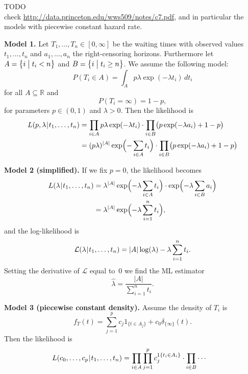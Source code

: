 \documentclass[a4paper]{article}
\def\cond#1#2{(#1\mskip1mu|\mskip1mu #2)}
\def\L{\mathcal{L}}
\def\R{\mathbb{R}}
\begin{document}
TODO\\
check \url{http://data.princeton.edu/wws509/notes/c7.pdf}, and in 
particular the models with piecewise constant hazard rate.

\bigskip

\textbf{Model 1.}
Let $T_1, \ldots, T_n \in [0, \infty]$ be the waiting times with observed
values $t_1, \ldots, t_n$ and $a_1,
\ldots, a_n$ the right-censoring horizons.  Furthermore let $A = \bigl\{ i \bigm|
t_i < n \bigr\}$ and $B = \bigl\{ i \bigm| t_i \geq n \bigr\}$.  We assume
the following model:
\begin{equation*}
  P(T_i \in A)
  = \int_A p \lambda \exp(-\lambda t_i) \,dt_i
\end{equation*}
for all $A\subseteq\R$ and
\begin{equation*}
  P(T_i = \infty)
  = 1-p,
\end{equation*}
for parameters $p\in(0,1)$ and $\lambda>0$.
Then the likelihood is
\begin{align*}
  L\cond{p, \lambda}{t_1, \ldots, t_n}
  &= \prod_{i\in A} p \lambda \exp(-\lambda t_i)
     \cdot \prod_{i\in B} \bigl(p \exp(-\lambda a_i) + 1-p \bigr) \\
   &= (p\lambda)^{|A|} \exp\Bigl( -\sum_{i\in A}t_i \Bigr)
     \cdot \prod_{i\in B} \bigl(p \exp(-\lambda a_i) + 1-p \bigr)
\end{align*}

\textbf{Model 2 (simplified).}
If we fix $p=0$, the likelihood becomes
\begin{align*}
  L\cond{\lambda}{t_1, \ldots, t_n}
   &= \lambda^{|A|} \exp\Bigl( - \lambda \sum_{i\in A}t_i \Bigr)
     \cdot \exp\Bigl( - \lambda \sum_{i\in B}a_i \Bigr) \\
   &= \lambda^{|A|} \exp\Bigl( - \lambda \sum_{i=1}^n t_i \Bigr),
\end{align*}
and the log-likelihood is
\begin{equation*}
  \L\cond{\lambda}{t_1, \ldots, t_n}
    = |A| \log(\lambda) - \lambda \sum_{i=1}^n t_i.
\end{equation*}
Setting the derivative of $\L$ equal to~$0$ we find
the ML estimator
\begin{equation*}
  \hat\lambda = \frac{|A|}{\sum_{i=1}^n t_i}.
\end{equation*}

\textbf{Model 3 (piecewise constant density).}
Assume the density of $T_i$ is
\begin{equation*}
  f_T(t)
  = \sum_{j=1}^p c_j 1_{\{t\in A_j\}} + c_0 \delta_{\{\infty\}}(t).
\end{equation*}
Then the likelihood is 
\begin{align*}
  L\cond{c_0, \ldots, c_p}{t_1, \ldots, t_n}
   &= \prod_{i\in A} \prod_{j=1}^p c_j^{1\{t_i\in A_i\}}
     \cdot \prod_{i\in B} \cdots
\end{align*}
\end{document}

